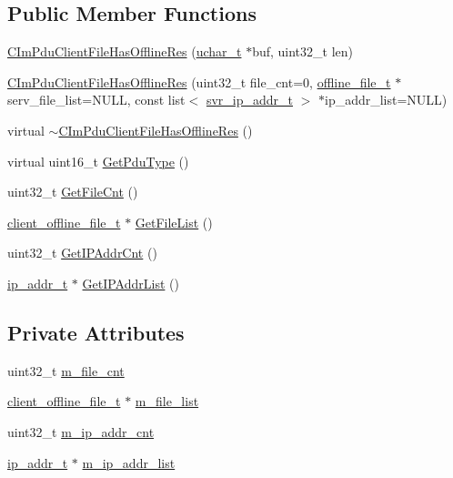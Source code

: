 \subsection*{Public Member Functions}
\begin{DoxyCompactItemize}
\item 
\hyperlink{class_c_im_pdu_client_file_has_offline_res_a080515d1388a5261ca2acdddba7632e9}{C\+Im\+Pdu\+Client\+File\+Has\+Offline\+Res} (\hyperlink{base_2ostype_8h_a124ea0f8f4a23a0a286b5582137f0b8d}{uchar\+\_\+t} $\ast$buf, uint32\+\_\+t len)
\item 
\hyperlink{class_c_im_pdu_client_file_has_offline_res_a06be55fc51394e0d75d1e59b578ba162}{C\+Im\+Pdu\+Client\+File\+Has\+Offline\+Res} (uint32\+\_\+t file\+\_\+cnt=0, \hyperlink{structoffline__file__t}{offline\+\_\+file\+\_\+t} $\ast$serv\+\_\+file\+\_\+list=N\+U\+L\+L, const list$<$ \hyperlink{structsvr__ip__addr__t}{svr\+\_\+ip\+\_\+addr\+\_\+t} $>$ $\ast$ip\+\_\+addr\+\_\+list=N\+U\+L\+L)
\item 
virtual \hyperlink{class_c_im_pdu_client_file_has_offline_res_a7dbac966f1be22df30b9d53856a1cfec}{$\sim$\+C\+Im\+Pdu\+Client\+File\+Has\+Offline\+Res} ()
\item 
virtual uint16\+\_\+t \hyperlink{class_c_im_pdu_client_file_has_offline_res_a4a8f050f2ee31d1270158ef4d4aef286}{Get\+Pdu\+Type} ()
\item 
uint32\+\_\+t \hyperlink{class_c_im_pdu_client_file_has_offline_res_a34b2fe0a44c4503ea16384a193907f7f}{Get\+File\+Cnt} ()
\item 
\hyperlink{structclient__offline__file__t}{client\+\_\+offline\+\_\+file\+\_\+t} $\ast$ \hyperlink{class_c_im_pdu_client_file_has_offline_res_ac15985ce80b3e1c07fb6b114502c8bb3}{Get\+File\+List} ()
\item 
uint32\+\_\+t \hyperlink{class_c_im_pdu_client_file_has_offline_res_a2355ed51ce8213c84d2058c9d8139f08}{Get\+I\+P\+Addr\+Cnt} ()
\item 
\hyperlink{structip__addr__t}{ip\+\_\+addr\+\_\+t} $\ast$ \hyperlink{class_c_im_pdu_client_file_has_offline_res_aca190ea94430bc74694abdd0c0f6af5d}{Get\+I\+P\+Addr\+List} ()
\end{DoxyCompactItemize}
\subsection*{Private Attributes}
\begin{DoxyCompactItemize}
\item 
uint32\+\_\+t \hyperlink{class_c_im_pdu_client_file_has_offline_res_ae80a761ee9962d9d78ee8fe5036a61fa}{m\+\_\+file\+\_\+cnt}
\item 
\hyperlink{structclient__offline__file__t}{client\+\_\+offline\+\_\+file\+\_\+t} $\ast$ \hyperlink{class_c_im_pdu_client_file_has_offline_res_a1e2afcfa4104612fae75343a6e67aa9c}{m\+\_\+file\+\_\+list}
\item 
uint32\+\_\+t \hyperlink{class_c_im_pdu_client_file_has_offline_res_aaf5d035a2257ed8090dac3f8482ba72d}{m\+\_\+ip\+\_\+addr\+\_\+cnt}
\item 
\hyperlink{structip__addr__t}{ip\+\_\+addr\+\_\+t} $\ast$ \hyperlink{class_c_im_pdu_client_file_has_offline_res_ab6f259087b0b8aa4c66e0bb2d7b5d2f5}{m\+\_\+ip\+\_\+addr\+\_\+list}
\end{DoxyCompactItemize}
